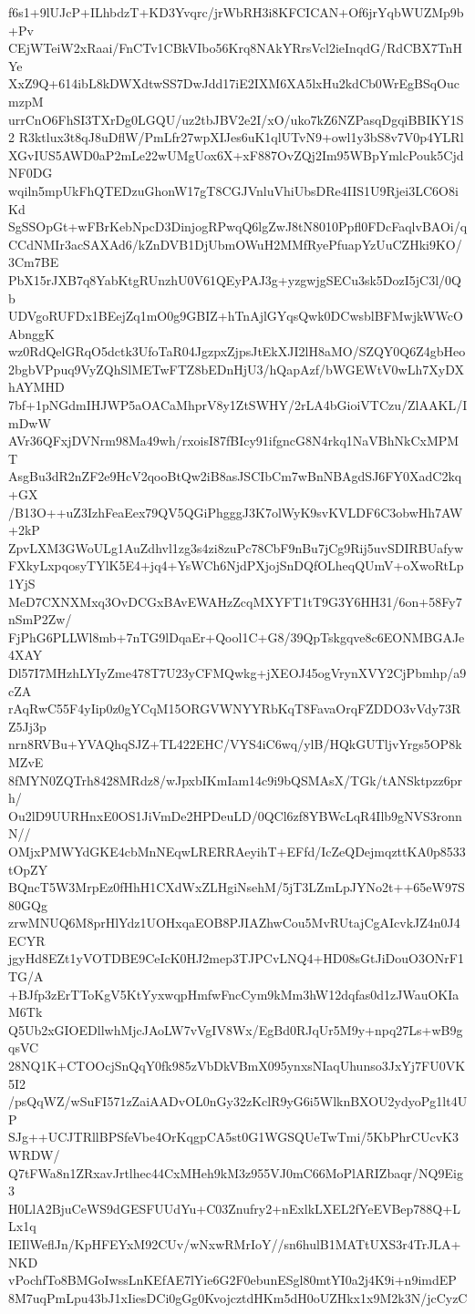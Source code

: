 f6s1+9lUJcP+ILhbdzT+KD3Yvqrc/jrWbRH3i8KFCICAN+Of6jrYqbWUZMp9b+Pv
CEjWTeiW2xRaai/FnCTv1CBkVIbo56Krq8NAkYRrsVcl2ieInqdG/RdCBX7TnHYe
XxZ9Q+614ibL8kDWXdtwSS7DwJdd17iE2IXM6XA5lxHu2kdCb0WrEgBSqOucmzpM
urrCnO6FhSI3TXrDg0LGQU/uz2tbJBV2e2I/xO/uko7kZ6NZPasqDgqiBBIKY1S2
R3ktlux3t8qJ8uDflW/PmLfr27wpXIJes6uK1qlUTvN9+owl1y3bS8v7V0p4YLRl
XGvIUS5AWD0aP2mLe22wUMgUox6X+xF887OvZQj2Im95WBpYmlcPouk5CjdNF0DG
wqiln5mpUkFhQTEDzuGhonW17gT8CGJVnluVhiUbsDRe4IIS1U9Rjei3LC6O8iKd
SgSSOpGt+wFBrKebNpcD3DinjogRPwqQ6lgZwJ8tN8010Ppfl0FDcFaqlvBAOi/q
CCdNMIr3acSAXAd6/kZnDVB1DjUbmOWuH2MMfRyePfuapYzUuCZHki9KO/3Cm7BE
PbX15rJXB7q8YabKtgRUnzhU0V61QEyPAJ3g+yzgwjgSECu3sk5DozI5jC3l/0Qb
UDVgoRUFDx1BEejZq1mO0g9GBIZ+hTnAjlGYqsQwk0DCwsblBFMwjkWWcOAbnggK
wz0RdQelGRqO5dctk3UfoTaR04JgzpxZjpsJtEkXJI2lH8aMO/SZQY0Q6Z4gbHeo
2bgbVPpuq9VyZQhSlMETwFTZ8bEDnHjU3/hQapAzf/bWGEWtV0wLh7XyDXhAYMHD
7bf+1pNGdmIHJWP5aOACaMhprV8y1ZtSWHY/2rLA4bGioiVTCzu/ZlAAKL/ImDwW
AVr36QFxjDVNrm98Ma49wh/rxoisI87fBIcy91ifgncG8N4rkq1NaVBhNkCxMPMT
AsgBu3dR2nZF2e9HcV2qooBtQw2iB8asJSCIbCm7wBnNBAgdSJ6FY0XadC2kq+GX
/B13O++uZ3IzhFeaEex79QV5QGiPhgggJ3K7olWyK9svKVLDF6C3obwHh7AW+2kP
ZpvLXM3GWoULg1AuZdhvl1zg3s4zi8zuPc78CbF9nBu7jCg9Rij5uvSDIRBUafyw
FXkyLxpqosyTYlK5E4+jq4+YsWCh6NjdPXjojSnDQfOLheqQUmV+oXwoRtLp1YjS
MeD7CXNXMxq3OvDCGxBAvEWAHzZcqMXYFT1tT9G3Y6HH31/6on+58Fy7nSmP2Zw/
FjPhG6PLLWl8mb+7nTG9lDqaEr+Qool1C+G8/39QpTskgqve8c6EONMBGAJe4XAY
Dl57I7MHzhLYIyZme478T7U23yCFMQwkg+jXEOJ45ogVrynXVY2CjPbmhp/a9cZA
rAqRwC55F4yIip0z0gYCqM15ORGVWNYYRbKqT8FavaOrqFZDDO3vVdy73RZ5Jj3p
nrn8RVBu+YVAQhqSJZ+TL422EHC/VYS4iC6wq/ylB/HQkGUTljvYrgs5OP8kMZvE
8fMYN0ZQTrh8428MRdz8/wJpxbIKmIam14c9i9bQSMAsX/TGk/tANSktpzz6prh/
Ou2lD9UURHnxE0OS1JiVmDe2HPDeuLD/0QCl6zf8YBWcLqR4Ilb9gNVS3ronnN//
OMjxPMWYdGKE4cbMnNEqwLRERRAeyihT+EFfd/IcZeQDejmqzttKA0p8533tOpZY
BQncT5W3MrpEz0fHhH1CXdWxZLHgiNsehM/5jT3LZmLpJYNo2t++65eW97S80GQg
zrwMNUQ6M8prHlYdz1UOHxqaEOB8PJIAZhwCou5MvRUtajCgAIcvkJZ4n0J4ECYR
jgyHd8EZt1yVOTDBE9CeIcK0HJ2mep3TJPCvLNQ4+HD08sGtJiDouO3ONrF1TG/A
+BJfp3zErTToKgV5KtYyxwqpHmfwFncCym9kMm3hW12dqfas0d1zJWauOKIaM6Tk
Q5Ub2xGIOEDllwhMjcJAoLW7vVgIV8Wx/EgBd0RJqUr5M9y+npq27Ls+wB9gqsVC
28NQ1K+CTOOcjSnQqY0fk985zVbDkVBmX095ynxsNIaqUhunso3JxYj7FU0VK5I2
/psQqWZ/wSuFI571zZaiAADvOL0nGy32zKclR9yG6i5WlknBXOU2ydyoPg1lt4UP
SJg++UCJTRllBPSfeVbe4OrKqgpCA5st0G1WGSQUeTwTmi/5KbPhrCUcvK3WRDW/
Q7tFWa8n1ZRxavJrtlhec44CxMHeh9kM3z955VJ0mC66MoPlARIZbaqr/NQ9Eig3
H0LlA2BjuCeWS9dGESFUUdYu+C03Znufry2+nExlkLXEL2fYeEVBep788Q+LLx1q
IEIlWeflJn/KpHFEYxM92CUv/wNxwRMrIoY//sn6hulB1MATtUXS3r4TrJLA+NKD
vPochfTo8BMGoIwssLnKEfAE7lYie6G2F0ebunESgl80mtYI0a2j4K9i+n9imdEP
8M7uqPmLpu43bJ1xIiesDCi0gGg0KvojcztdHKm5dH0oUZHkx1x9M2k3N/jcCyzC
